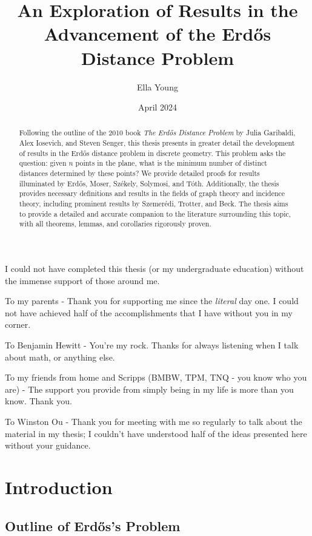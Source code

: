 \documentclass{scrippsthesisclass}
\title{An Exploration of Results in the Advancement of the  Erd\H{o}s Distance Problem}
\author{Ella Young}
\date{April 2024}
\theoremstyle{definition}
\begin{document}
\maketitle
\restoregeometry
\tableofcontents
\begin{abstract}
    Following the outline of the 2010 book \textit{The Erd\H{o}s Distance Problem} by Julia Garibaldi, Alex Iosevich, and Steven Senger, this thesis presents in greater detail the development of results in the Erd\H{o}s distance problem in discrete geometry. 
    This problem asks the question: given $n$ points in the plane, what is the minimum number of distinct distances determined by these points?
    We provide detailed proofs for results illuminated by Erd\H{o}s, Moser, Sz\'{e}kely, Solymosi, and T\'{o}th.
    Additionally, the thesis provides necessary definitions and results in the fields of graph theory and incidence theory, including prominent results by Szemer\'{e}di, Trotter, and Beck. 
    The thesis aims to provide a detailed and accurate companion to the literature surrounding this topic, with all theorems, lemmas, and corollaries rigorously proven. 
\end{abstract}

\begin{acknowledgments}
I could not have completed this thesis (or my undergraduate education) without the immense support of those around me.

To my parents - Thank you for supporting me since the \textit{literal} day one.
I could not have achieved half of the accomplishments that I have without you in my corner. 

To Benjamin Hewitt - You're my rock. 
Thanks for always listening when I talk about math, or anything else. 

To my friends from home and Scripps (BMBW, TPM, TNQ - you know who you are) - The support you provide from simply being in my life is more than you know. Thank you.

To Winston Ou - Thank you for meeting with me so regularly to talk about the material in my thesis; 
I couldn't have understood half of the ideas presented here without your guidance. 

\end{acknowledgments}
\chapter{Introduction}
\section{Outline of Erd\H{o}s's Problem}
\end{document}
